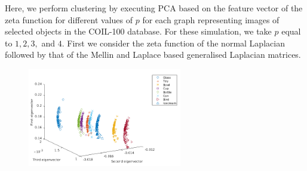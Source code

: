 \documentclass[10pt,a4paper]{article}
\theoremstyle{plain}
\theoremstyle{definition}
\begin{document}
Here, we perform clustering by executing PCA based on the feature vector of the zeta function for different values of $p$ for each graph representing images of selected objects in the COIL-100 database. For these simulation, we take $p$ equal to $1,2,3,$ and $4$. First we consider the zeta function of the normal Laplacian followed by that of the Mellin and Laplace based generalised Laplacian matrices.
\begin{figure}[H]
	\centering
	\includegraphics[width=0.6\textwidth]{images/Zeta-nolongrange.png}
	\caption{}
	\label{}
\end{figure}
\end{document}
